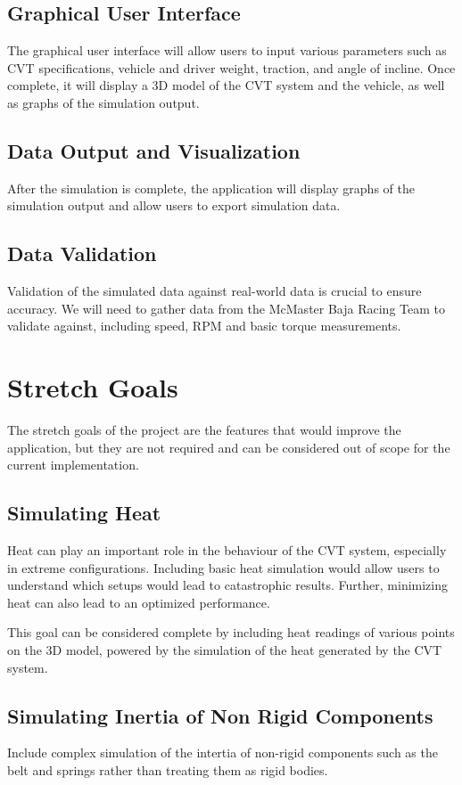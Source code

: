 \documentclass{article}
\begin{document}
\subsection{Graphical User Interface}
The graphical user interface will allow users to input various parameters such as CVT specifications, 
vehicle and driver weight, traction, and angle of incline. Once complete, it will display a 3D model
of the CVT system and the vehicle, as well as graphs of the simulation output.

\subsection{Data Output and Visualization}
After the simulation is complete, the application will display graphs of the simulation output 
and allow users to export simulation data.

\subsection{Data Validation}
Validation of the simulated data against real-world data is crucial to ensure accuracy. 
We will need to gather data from the McMaster Baja Racing Team to validate against, including 
speed, RPM and basic torque measurements.

\section{Stretch Goals}
The stretch goals of the project are the features that would improve the application,
but they are not required and can be considered out of scope for the current implementation.

\subsection{Simulating Heat}
Heat can play an important role in the behaviour of the CVT system, especially in extreme 
configurations. Including basic heat simulation would allow users to understand which
setups would lead to catastrophic results. Further, minimizing heat can also lead to an optimized
performance.

This goal can be considered complete by including heat readings of various points on the 3D 
model, powered by the simulation of the heat generated by the CVT system.

\subsection{Simulating Inertia of Non Rigid Components}
Include complex simulation of the intertia of non-rigid components such as the belt and 
springs rather than treating them as rigid bodies.
\end{document}
